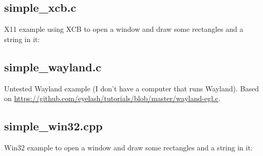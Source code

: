 \documentclass{article}
\begin{document}
\subsection{simple\_xcb.c}
\label{subsec:simple_xcb.c}

X11 example using XCB to open a window and draw some rectangles and a string
in it:



\subsection{simple\_wayland.c}
\label{subsec:simple_wayland.c}

Untested Wayland example (I don't have a computer that runs Wayland).
Based on \url{https://github.com/eyelash/tutorials/blob/master/wayland-egl.c}.



\subsection{simple\_win32.cpp}
\label{subsec:simple_win32.cpp}

Win32 example to open a window and draw some rectangles and a string in it:


\end{document}
